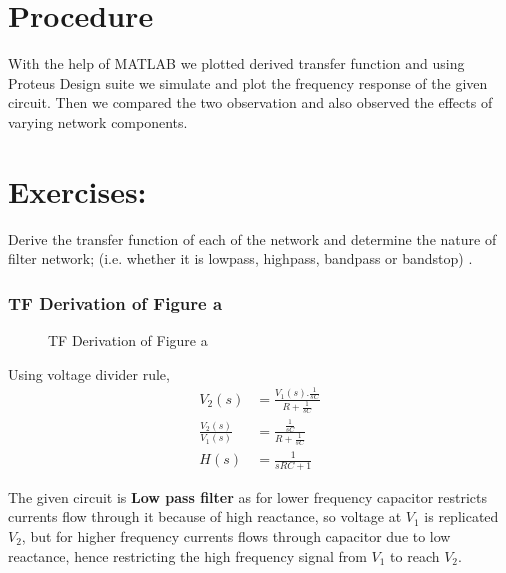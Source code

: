 \documentclass[a4paper,11pt]{article}
\begin{document}
\section{Procedure}

With the help of MATLAB we plotted derived transfer function and using Proteus Design suite we simulate and plot the frequency response of the given circuit. Then we compared the two observation and also observed the effects of varying network components.



\pagebreak

\section{Exercises:}


\begin{Q}
    {
        Derive the transfer function of each of the network and determine the nature of filter network; (i.e. whether it is lowpass, highpass, bandpass or bandstop) .
    }
\end{Q}

\subsubsection{TF Derivation of Figure a}
\begin{figure}[H]
    \centering
    \figa \figas
    \caption{TF Derivation of Figure a}
\end{figure}

Using voltage divider rule,
\begin{equation*}
    \begin{aligned}
        V_2(s)                & =\frac{V_1(s).\frac{1}{sC}}{R+\frac{1}{sC}} \\
        \frac{V_2(s)}{V_1(s)} & =\frac{\frac{1}{sC}}{R+\frac{1}{sC}}        \\
        H(s)                  & =\frac{1}{sRC+1}
    \end{aligned}
\end{equation*}

The given circuit is \textbf{Low pass filter} as for lower frequency capacitor restricts currents flow through it because of high reactance, so voltage at $V_1$ is replicated $V_2$, but for higher frequency currents flows through capacitor due to low reactance, hence restricting the high frequency signal from $V_1$ to reach $V_2$.
\end{document}

